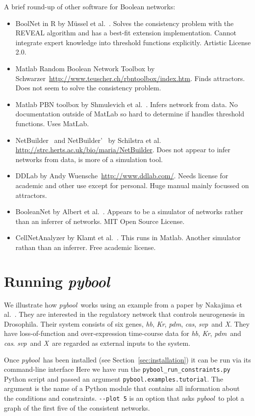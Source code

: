 \documentclass{article}
\newcommand{\pybool}{\emph{pybool}}
\newcommand{\hb}{\emph{hb}}
\newcommand{\pdm}{\emph{pdm}}
\newcommand{\Kr}{\emph{Kr}}
\newcommand{\cas}{\emph{cas}}
\newcommand{\svp}{\emph{svp}}
\newcommand{\X}{\emph{X}}
\begin{document}
A brief round-up of other software for Boolean networks:
\begin{itemize}
\item BoolNet in R by M\"ussel et al.~\cite{Muessel2010}. Solves the consistency problem with the REVEAL algorithm and has a best-fit extension implementation. Cannot integrate expert knowledge into threshold functions explicitly. Artistic License 2.0.
\item Matlab Random Boolean Network Toolbox by Schwarzer~\url{http://www.teuscher.ch/rbntoolbox/index.htm}. Finds attractors. Does not seem to solve the consistency problem.
\item Matlab PBN toolbox by Shmulevich et al.~\cite{Shmulevich2002}. Infers network from data. No documentation outside of MatLab so hard to determine if handles threshold functions. Uses MatLab.
\item NetBuilder~\cite{Brown2002} and NetBuilder'~\cite{Wegner2007} by Schilstra et al. \url{http://strc.herts.ac.uk/bio/maria/NetBuilder}. Does not appear to infer networks from data, is more of a simulation tool.
\item DDLab by Andy Wuensche~\url{http://www.ddlab.com/}. Needs license for academic and other use except for personal. Huge manual mainly focussed on attractors.
\item BooleanNet by Albert et al.~\cite{Albert2008}. Appears to be a simulator of networks rather than an inferrer of networks. MIT Open Source License.
\item CellNetAnalyzer by Klamt et al.~\cite{Klamt2007}. This runs in Matlab. Another simulator rathan than an inferrer. Free academic license.
\end{itemize}





\section{Running \pybool}

We illustrate how \pybool\ works using an example from a paper by Nakajima et al.~\cite{Nakajima2010}. They are interested in the regulatory network that controls neurogenesis in Drosophila. Their system consists of six genes, \hb, \Kr, \pdm, \cas, \svp\ and \X. They have loss-of-function and over-expression time-course data for \hb, \Kr, \pdm\ and \cas. \svp\ and \X\ are regarded as external inputs to the system.

Once \pybool\ has been installed (see Section~\ref{sec:installation}) it can be run via its command-line interface
Here we have run the \verb!pybool_run_constraints.py! Python script and passed an argument \verb!pybool.examples.tutorial!. The argument is the name of a Python module that contains all information about the conditions and constraints. \verb!--plot 5! is an option that asks \pybool\ to plot a graph of the first five of the consistent networks.
\end{document}
